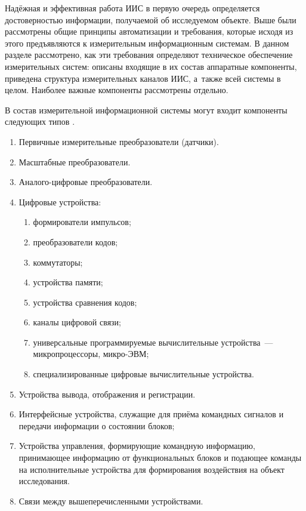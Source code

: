 \documentclass[a4paper, 14pt, titlepage]{extarticle}
\begin{document}
  Надёжная и эффективная работа ИИС в первую очередь определяется достоверностью информации,
  получаемой об исследуемом объекте. Выше были рассмотрены общие принципы автоматизации и
  требования, которые исходя из этого предъявляются к измерительным информационным системам.
  В данном разделе рассмотрено, как эти требования определяют техническое обеспечение измерительных систем: описаны входящие в их
  состав аппаратные компоненты, приведена структура измерительных каналов ИИС, а~также всей системы
  в целом. Наиболее важные компоненты рассмотрены отдельно.


  В состав измерительной информационной системы могут входит компоненты следующих типов
  \cite[с.~8]{volkov-iis}.
  \begin{enumerate}
    \item Первичные измерительные преобразователи (датчики).
    \item Масштабные преобразователи.
    \item Аналого-цифровые преобразователи.
    \item Цифровые устройства:
      \begin{enumerate}
        \item формирователи импульсов;
        \item преобразователи кодов;
        \item коммутаторы;
        \item устройства памяти;
        \item устройства сравнения кодов;
        \item каналы цифровой связи;
        \item универсальные программируемые вычислительные устройства~--- микропроцессоры, микро-ЭВМ;
        \item специализированные цифровые вычислительные устройства.
      \end{enumerate}
    \item Устройства вывода, отображения и регистрации.
    \item Интерфейсные устройства, служащие для приёма командных сигналов и передачи информации о
      состоянии блоков;
    \item Устройства управления, формирующие командную информацию, принимающее информацию от
      функциональных блоков и подающее команды на исполнительные устройства для формирования
      воздействия на объект исследования.
    \item Связи между вышеперечисленными устройствами.
  \end{enumerate}
\end{document}
